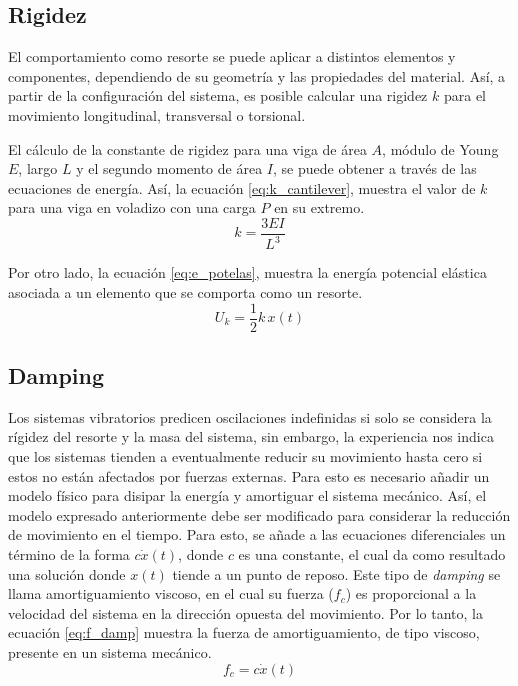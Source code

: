 \subsection{Rigidez}
El comportamiento como resorte se puede aplicar a distintos elementos y componentes, dependiendo de su geometría y las propiedades del material. Así, a partir de la configuración del sistema, es posible calcular una rigidez $k$ para el movimiento longitudinal, transversal o torsional. 

El cálculo de la constante de rigidez para una viga de área $A$, módulo de Young $E$, largo $L$ y el segundo momento de área $I$, se puede obtener a través de las ecuaciones de energía. Así, la ecuación \ref{eq:k_cantilever}, muestra el valor de $k$ para una viga en voladizo con una carga $P$ en su extremo.
\begin{equation}\label{eq:k_cantilever}
	k = \frac{3EI}{L^3}
\end{equation}

Por otro lado, la ecuación \ref{eq:e_potelas}, muestra la energía potencial elástica asociada a un elemento que se comporta como un resorte.
\begin{equation}\label{eq:e_potelas}
	U_k = \frac{1}{2}k\,x(t)
\end{equation}


\subsection{Damping}
\label{sec:damping}
Los sistemas vibratorios predicen oscilaciones indefinidas si solo se considera la rígidez del resorte y la masa del sistema, sin embargo, la experiencia nos indica que los sistemas tienden a eventualmente reducir su movimiento hasta cero si estos no están afectados por fuerzas externas. Para esto es necesario añadir un modelo físico para disipar la energía y amortiguar el sistema mecánico. Así, el modelo expresado anteriormente debe ser modificado para considerar la reducción de movimiento en el tiempo. Para esto, se añade a las ecuaciones diferenciales un término de la forma $c\dot{x}(t)$, donde $c$ es una constante, el cual da como resultado una solución donde $x(t)$ tiende a un punto de reposo. Este tipo de \textit{damping} se llama amortiguamiento viscoso, en el cual su fuerza ($f_c$) es proporcional a la velocidad del sistema en la dirección opuesta del movimiento. Por lo tanto, la ecuación \ref{eq:f_damp} muestra la fuerza de amortiguamiento, de tipo viscoso, presente en un sistema mecánico.
\begin{equation}\label{eq:f_damp}
	f_c = c\dot{x}(t)
\end{equation}

